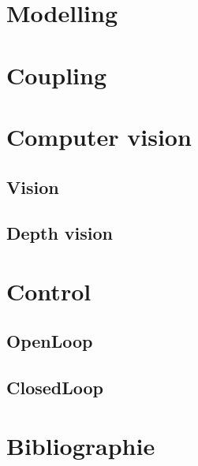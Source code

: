 \documentclass[12pt]{report}
\begin{document}
\newpage
\chapter{Modelling}

\newpage
\chapter{Coupling}

\newpage
\chapter{Computer vision}
\section{Vision}

\section{Depth vision}


\newpage
\chapter{Control}
\section{OpenLoop}

\section{ClosedLoop}

\newpage
\chapter*{Bibliographie}
\end{document}
